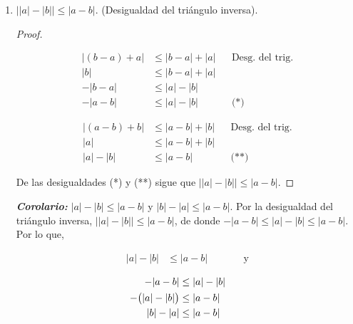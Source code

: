 \documentclass[11pt]{article}
\newcommand{\bfit}[1]{\textbf{\textit{#1}}}
\begin{document}
\begin{enumerate}[label=\alph*)]
    \item $\big| |a|-|b| \big| \leq |a-b|$. (Desigualdad del triángulo inversa).

    \begin{proof} \leavevmode
    \begin{center}\vspace{-2.5em}
    \begin{minipage}[t]{.5\linewidth}
    \begin{align*}
        |(b-a)+a| &\leq |b-a|+|a| && \text{Desg. del trig.} \\
        |b| &\leq |b-a|+|a| \\
        -|b-a| &\leq |a|-|b| \\
        -|a-b| &\leq |a|-|b| && \text{(*)}
    \end{align*}
    \end{minipage}%
    \begin{minipage}[t]{.5\linewidth}
    \begin{align*}
        |(a-b)+b| &\leq |a-b|+|b| && \text{Desg. del trig.} \\
        |a| &\leq |a-b|+|b| \\
        |a|-|b| &\leq |a-b| && \text{(**)}
    \end{align*}
    \end{minipage}
    \end{center}
    De las desigualdades (*) y (**) sigue que $\big| |a| - |b| \big| \leq |a-b|$.
    \end{proof} \vspace{-1em}

    \bfit{Corolario:} $|a|-|b|\leq |a-b|$ y $|b|-|a|\leq |a-b|$.
    Por la desigualdad del triángulo inversa, $\big| |a|-|b| \big| \leq |a-b|$, de donde $-|a-b|\leq |a|-|b|\leq |a-b|$. Por lo que,
    \begin{center}\vspace{-2em}
    \begin{minipage}[t]{.3\linewidth}
    \begin{align*}
        |a|-|b| &\leq |a-b| && \qquad \text{y}
    \end{align*}
    \end{minipage}%
    \begin{minipage}[t]{.3\linewidth}
    \begin{align*}
        -|a-b| &\leq |a|-|b|\\
        -\bigl(|a|-|b|\bigr) &\leq |a-b| \\
        |b|-|a| &\leq |a-b| && \qedhere
    \end{align*}
    \end{minipage}
    \end{center}


\end{enumerate}
\end{document}
